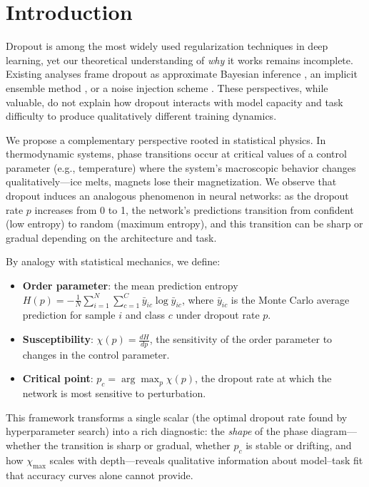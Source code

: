 \documentclass{article}
\begin{document}
\section{Introduction}
\label{sec:introduction}

Dropout \citep{srivastava2014dropout} is among the most widely used regularization techniques in deep learning, yet our theoretical understanding of \emph{why} it works remains incomplete. Existing analyses frame dropout as approximate Bayesian inference \citep{gal2016dropout}, an implicit ensemble method \citep{hara2016analysis}, or a noise injection scheme \citep{wager2013dropout}. These perspectives, while valuable, do not explain how dropout interacts with model capacity and task difficulty to produce qualitatively different training dynamics.

We propose a complementary perspective rooted in statistical physics. In thermodynamic systems, phase transitions occur at critical values of a control parameter (e.g., temperature) where the system's macroscopic behavior changes qualitatively---ice melts, magnets lose their magnetization. We observe that dropout induces an analogous phenomenon in neural networks: as the dropout rate $p$ increases from 0 to 1, the network's predictions transition from confident (low entropy) to random (maximum entropy), and this transition can be sharp or gradual depending on the architecture and task.

By analogy with statistical mechanics, we define:
\begin{itemize}
    \item \textbf{Order parameter}: the mean prediction entropy $H(p) = -\frac{1}{N}\sum_{i=1}^{N}\sum_{c=1}^{C} \bar{y}_{ic} \log \bar{y}_{ic}$, where $\bar{y}_{ic}$ is the Monte Carlo average prediction for sample $i$ and class $c$ under dropout rate $p$.
    \item \textbf{Susceptibility}: $\chi(p) = \frac{dH}{dp}$, the sensitivity of the order parameter to changes in the control parameter.
    \item \textbf{Critical point}: $p_c = \arg\max_p \chi(p)$, the dropout rate at which the network is most sensitive to perturbation.
\end{itemize}

This framework transforms a single scalar (the optimal dropout rate found by hyperparameter search) into a rich diagnostic: the \emph{shape} of the phase diagram---whether the transition is sharp or gradual, whether $p_c$ is stable or drifting, and how $\chi_{\max}$ scales with depth---reveals qualitative information about model--task fit that accuracy curves alone cannot provide.
\end{document}
